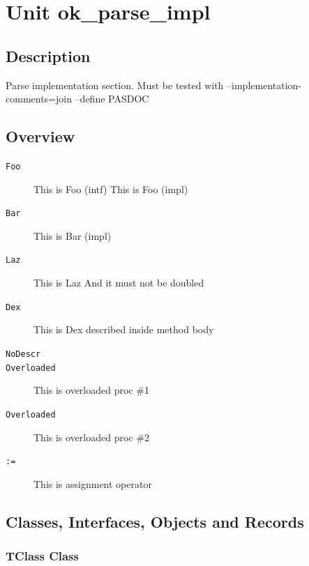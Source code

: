 \documentclass{report}
\newif\ifpdf
\begin{document}
\label{toc}\tableofcontents
\newpage
\newlength{\tmplength}
\chapter{Unit ok{\_}parse{\_}impl}
\label{ok_parse_impl}
\section{Description}
Parse implementation section. Must be tested with --implementation{-}comments=join --define PASDOC
\section{Overview}
\begin{description}
\item[\texttt{\begin{ttfamily}TClass\end{ttfamily} Class}]
\item[\texttt{\begin{ttfamily}TMyType\end{ttfamily} Record}]
\end{description}
\begin{description}
\item[\texttt{Foo}]This is Foo (intf) This is Foo (impl)
\item[\texttt{Bar}]This is Bar (impl)
\item[\texttt{Laz}]This is Laz And it must not be doubled
\item[\texttt{Dex}]This is Dex described inside method body
\item[\texttt{NoDescr}]
\item[\texttt{Overloaded}]This is overloaded proc {\#}1
\item[\texttt{Overloaded}]This is overloaded proc {\#}2
\item[\texttt{:=}]This is assignment operator
\end{description}
\section{Classes, Interfaces, Objects and Records}
\ifpdf
\subsection*{\large{\textbf{TClass Class}}\normalsize\hspace{1ex}\hrulefill}
\else
\end{document}
